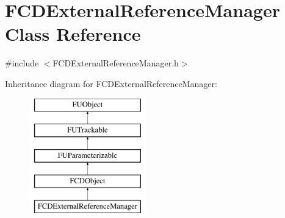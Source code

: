 \hypertarget{classFCDExternalReferenceManager}{
\section{FCDExternalReferenceManager Class Reference}
\label{classFCDExternalReferenceManager}
}


{\ttfamily \#include $<$FCDExternalReferenceManager.h$>$}

Inheritance diagram for FCDExternalReferenceManager:\begin{figure}[H]
\begin{center}
\leavevmode
\includegraphics[height=5.000000cm]{classFCDExternalReferenceManager}
\end{center}
\end{figure}
